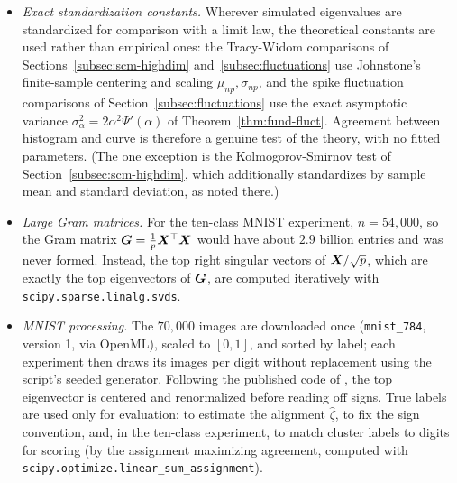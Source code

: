 \begin{itemize}
  \item \emph{Exact standardization constants.} Wherever simulated eigenvalues are standardized for comparison with a limit law, the theoretical constants are used rather than empirical ones: the Tracy-Widom comparisons of Sections~\ref{subsec:scm-highdim} and~\ref{subsec:fluctuations} use Johnstone's finite-sample centering and scaling \(\mu_{np}, \sigma_{np}\), and the spike fluctuation comparisons of Section~\ref{subsec:fluctuations} use the exact asymptotic variance \(\sigma_\alpha^2 = 2\alpha^2 \Psi'(\alpha)\) of Theorem~\ref{thm:fund-fluct}. Agreement between histogram and curve is therefore a genuine test of the theory, with no fitted parameters. (The one exception is the Kolmogorov-Smirnov test of Section~\ref{subsec:scm-highdim}, which additionally standardizes by sample mean and standard deviation, as noted there.)
  \item \emph{Large Gram matrices.} For the ten-class MNIST experiment, \(n = 54{,}000\), so the Gram matrix \(\bm{G} = \frac{1}{p}\bm{X}^{\top}\bm{X}\) would have about \(2.9\) billion entries and was never formed. Instead, the top right singular vectors of \(\bm{X}/\sqrt{p}\), which are exactly the top eigenvectors of \(\bm{G}\), are computed iteratively with \texttt{scipy.sparse.linalg.svds}.
  \item \emph{MNIST processing.} The \(70{,}000\) images are downloaded once (\texttt{mnist\_784}, version 1, via OpenML), scaled to \([0, 1]\), and sorted by label; each experiment then draws its images per digit without replacement using the script's seeded generator. Following the published code of \citet{LebeauChatelainCouillet2024}, the top eigenvector is centered and renormalized before reading off signs. True labels are used only for evaluation: to estimate the alignment \(\widehat{\zeta}\), to fix the sign convention, and, in the ten-class experiment, to match cluster labels to digits for scoring (by the assignment maximizing agreement, computed with \texttt{scipy.optimize.linear\_sum\_assignment}).
\end{itemize}

\clearpage
